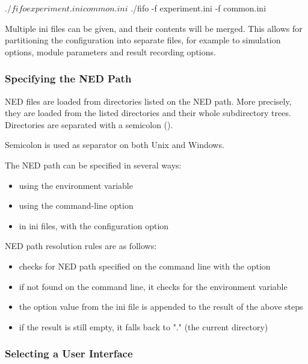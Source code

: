 \begin{commandline}
$ ./fifo experiment.ini common.ini
$ ./fifo -f experiment.ini -f common.ini
\end{commandline}

Multiple ini files can be given, and their contents will be merged. This
allows for partitioning the configuration into separate files, for example
to simulation options, module parameters and result recording options.


\subsubsection{Specifying the NED Path}
\label{sec:run-sim:specifying-ned-path}

NED files are loaded from directories listed on the NED path. More precisely,
they are loaded from the listed directories and their whole subdirectory trees.
Directories are separated with a semicolon (\ttt{;}).

\begin{note}
Semicolon is used as separator on both Unix and Windows.
\end{note}

The NED path can be specified in several ways:
\begin{itemize}
  \item using the  environment variable
  \item using the  command-line option
  \item in ini files, with the  configuration option
\end{itemize}

NED path resolution rules are as follows:

\begin{itemize}
  \item {\opp} checks for NED path specified on the command line with the  option
  \item if not found on the command line, it checks for the  environment variable
  \item the  option value from the ini file is appended to the result of the above steps
  \item if the result is still empty, it falls back to "." (the current directory)
\end{itemize}


\subsubsection{Selecting a User Interface}
\label{sec:run-sim:selecting-user-interface}

